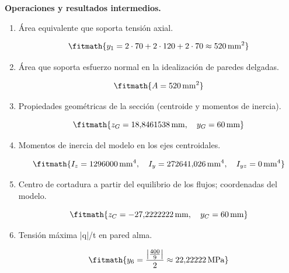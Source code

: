 \noindent\textbf{Operaciones y resultados intermedios.}

\begin{enumerate}

\item Área equivalente que soporta tensión axial.

\[\fitmath{y_{1}=2\cdot 70+2\cdot 120+2\cdot 70\approx 520\,\mathrm{mm^{2}}}\]

\item Área que soporta esfuerzo normal en la idealización de paredes delgadas.

\[\fitmath{A=520\,\mathrm{mm^2}}\]

\item Propiedades geométricas de la sección (centroide y momentos de inercia).

\[\fitmath{z_G=18{,}8461538\,\mathrm{mm},\quad y_G=60\,\mathrm{mm}}\]

\item Momentos de inercia del modelo en los ejes centroidales.

\[\fitmath{I_z=1296000\,\mathrm{mm}^{4},\quad I_y=272641{,}026\,\mathrm{mm}^{4},\quad I_{yz}=0\,\mathrm{mm}^{4}}\]

\item Centro de cortadura a partir del equilibrio de los flujos; coordenadas del modelo.

\[\fitmath{z_C=-27{,}2222222\,\mathrm{mm},\quad y_C=60\,\mathrm{mm}}\]

\item Tensión máxima |q|/t en pared alma.

\[\fitmath{y_{6}=\frac{\left|\frac{400}{9}\right|}{2}\approx 22{,}22222\,\mathrm{MPa}}\]

\end{enumerate}
